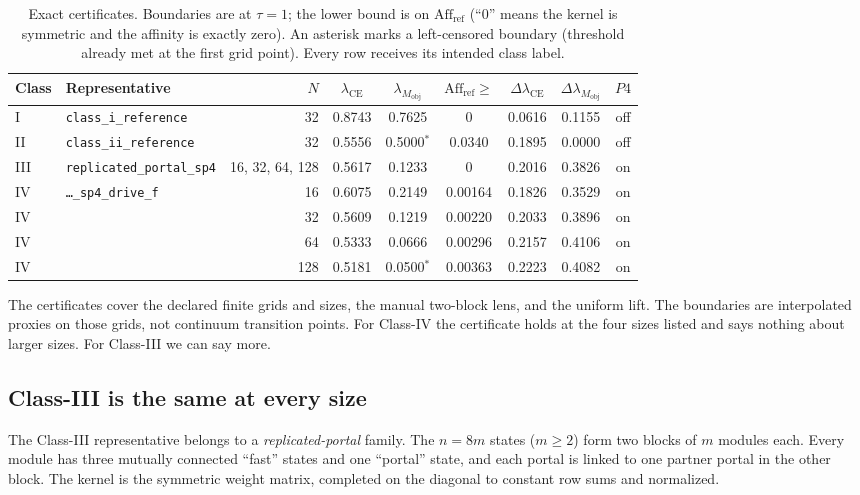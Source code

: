 \begin{table}[tbp]
\centering
\small
\caption{Exact certificates. Boundaries are at $\tau=1$; the lower bound is on $\mathrm{Aff}_{\mathrm{ref}}$ (``$0$'' means the kernel is symmetric and the affinity is exactly zero). An asterisk marks a left-censored boundary (threshold already met at the first grid point). Every row receives its intended class label.}
\label{tab:certificates}
\setlength{\tabcolsep}{4.5pt}
\begin{tabular}{@{}llrcccccc@{}}
\toprule
Class & Representative & $N$ & $\lambda_{\mathrm{CE}}$ & $\lambda_{M_{\mathrm{obj}}}$ & $\mathrm{Aff}_{\mathrm{ref}}\ge$ & $\Delta\lambda_{\mathrm{CE}}$ & $\Delta\lambda_{M_{\mathrm{obj}}}$ & $P4$ \\
\midrule
I   & \texttt{class\_i\_reference}  & 32  & 0.8743 & 0.7625 & $0$ & 0.0616 & 0.1155 & off \\
II  & \texttt{class\_ii\_reference} & 32  & 0.5556 & 0.5000$^{*}$ & 0.0340 & 0.1895 & 0.0000 & off \\
III & \texttt{replicated\_portal\_sp4} & 16, 32, 64, 128 & 0.5617 & 0.1233 & $0$ & 0.2016 & 0.3826 & on \\
IV  & \texttt{\ldots\_sp4\_drive\_f} & 16  & 0.6075 & 0.2149 & 0.00164 & 0.1826 & 0.3529 & on \\
IV  & & 32  & 0.5609 & 0.1219 & 0.00220 & 0.2033 & 0.3896 & on \\
IV  & & 64  & 0.5333 & 0.0666 & 0.00296 & 0.2157 & 0.4106 & on \\
IV  & & 128 & 0.5181 & 0.0500$^{*}$ & 0.00363 & 0.2223 & 0.4082 & on \\
\bottomrule
\end{tabular}
\end{table}

The certificates cover the declared finite grids and sizes, the manual two-block lens, and the uniform lift. The boundaries are interpolated proxies on those grids, not continuum transition points. For Class-IV the certificate holds at the four sizes listed and says nothing about larger sizes. For Class-III we can say more.

\subsection{Class-III is the same at every size}

The Class-III representative belongs to a \emph{replicated-portal} family. The $n=8m$ states ($m\ge 2$) form two blocks of $m$ modules each. Every module has three mutually connected ``fast'' states and one ``portal'' state, and each portal is linked to one partner portal in the other block. The kernel is the symmetric weight matrix, completed on the diagonal to constant row sums and normalized.

